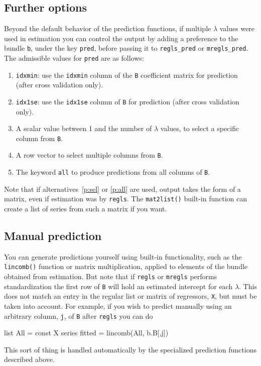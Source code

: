 \documentclass{article}
\begin{document}
\subsection{Further options}

Beyond the default behavior of the prediction functions, if multiple
$\lambda$ values were used in estimation you can control the output by
adding a preference to the bundle \texttt{b}, under the key
\texttt{pred}, before passing it to \texttt{regls\_pred} or
\texttt{mregls\_pred}. The admissible values for \texttt{pred} are as
follows:
\begin{enumerate}
\item \texttt{idxmin}: use the \texttt{idxmin} column of the \texttt{B}
  coefficient matrix for prediction (after cross validation only).
\item \texttt{idx1se}: use the \texttt{idx1se} column of \texttt{B}
  for prediction (after cross validation only).
\item A scalar value between 1 and the number of $\lambda$ values, to
  select a specific column from \texttt{B}.
\item A row vector to select multiple columns from
  \texttt{B}.\label{p:sel}
\item The keyword \texttt{all} to produce predictions from all columns of
  \texttt{B}.\label{p:all}
\end{enumerate}

Note that if alternatives~\ref{p:sel} or \ref{p:all} are used, output
takes the form of a matrix, even if estimation was by
\texttt{regls}. The \texttt{mat2list()} built-in function can create a
list of series from such a matrix if you want.

\subsection{Manual prediction}

You can generate predictions yourself using built-in functionality,
such as the \texttt{lincomb()} function or matrix multiplication,
applied to elements of the bundle obtained from estimation. But note
that if \texttt{regls} or \texttt{mregls} performs standardization the
first row of \texttt{B} will hold an estimated intercept for each
$\lambda$. This does not match an entry in the regular list or matrix
of regressors, \texttt{X}, but must be taken into account. For
example, if you wish to predict manually using an arbitrary column,
\texttt{j}, of \texttt{B} after \texttt{regls} you can do
\begin{code}
list All = const X
series fitted = lincomb(All, b.B[,j])
\end{code}
This sort of thing is handled automatically by the specialized
prediction functions described above.
\end{document}
